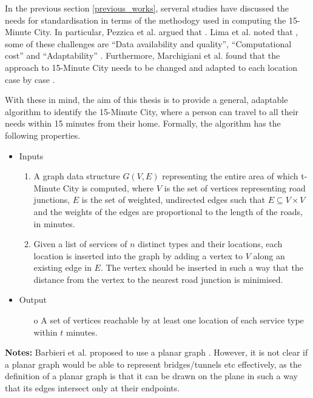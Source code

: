 In the previous section \ref{previous_works}, serveral studies have discussed the needs for standardisation in terms of the methodogy used in computing the 15-Minute City. In particular, Pezzica et al. argued that  \cite{Pezzica_Altafini_Mara_Chioni_2024}. Lima et al. noted that , some of these challenges are “Data availability and quality”, “Computational cost” and “Adaptability” \cite{lima_quest_2023}. Furthermore, Marchigiani et al. found that the approach to 15-Minute City needs to be changed and adapted to each location case by case \cite{marchigiani_urban_2022}.

With these in mind, the aim of this thesis is to provide a general, adaptable algorithm to identify the 15-Minute City, where a person can travel to all their needs within 15 minutes from their home. Formally, the algorithm has the following properties.

\begin{itemize}
    \item Inputs
    \begin{enumerate}
        \item A graph data structure $G(V,E)$ representing the entire area of which t-Minute City is computed, where $V$ is the set of vertices representing road junctions, $E$ is the set of weighted, undirected edges such that $E\subseteq V\times V$ and the weights of the edges are proportional to the length of the roads, in minutes.
        \item Given a list of services of $n$ distinct types and their locations, each location is inserted into the graph by adding a vertex to $V$ along an existing edge in $E$. The vertex should be inserted in such a way that the distance from the vertex to the nearest road junction is minimised.
    \end{enumerate}
    \item Output
    \begin{itemize}
        \item[o] A set of vertices reachable by at least one location of each service type within $t$ minutes.
    \end{itemize}
\end{itemize}

\textbf{Notes:} Barbieri et al. proposed to use a planar graph \cite{barbieri_graph_2023}. However, it is not clear if a planar graph would be able to represent bridges/tunnels etc effectively, as the definition of a planar graph is that it can be drawn on the plane in such a way that its edges intersect only at their endpoints.